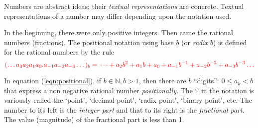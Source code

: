 Numbers are abstract ideas; their \textit{textual representations} are concrete. Textual representations of a number may differ depending upon the notation used.

In the beginning, there were only positive integers. Then came the rational numbers (fractions). The positional notation using base $b$ (or \textit{radix} $b$) is defined for the rational numbers by the rule
\begin{equation} \label{eqn:positional}
\mathcolor{red}
{
(\dots a_{3}a_{2}a_{1}a_{0}.a_{-1}a_{-2}a_{-3}\dots)_{b} = \\
\dots +a_{2}b^{2}+a_{1}b+a_{0}+a_{-1}b^{-1}+a_{-2}b^{-2}+a_{-3}b^{-3}\dots
}
\end{equation}

In equation (\ref{eqn:positional}), if $b \in \mathbb{N}, b > 1$, then there are $b$ ``digits'': $0\le a_k < b$ that express a non negative rational number \textit{positionally}. The `.' in the notation is variously called the `point', `decimal point', `radix point', `binary point', etc. The number to its left is the \emph{integer part} and that to its right is the \emph{fractional part}. The value (magnitude) of the fractional part is less than 1.


